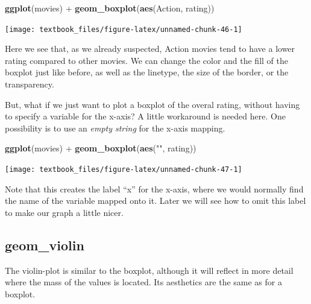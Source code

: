 \documentclass[]{tufte-book}
\newenvironment{Shaded}{}{}
\newcommand{\KeywordTok}[1]{\textcolor[rgb]{0.00,0.44,0.13}{\textbf{#1}}}
\newcommand{\NormalTok}[1]{#1}
\newcommand{\OperatorTok}[1]{\textcolor[rgb]{0.40,0.40,0.40}{#1}}
\newcommand{\StringTok}[1]{\textcolor[rgb]{0.25,0.44,0.63}{#1}}
\begin{document}
\begin{Shaded}
\begin{Highlighting}[]
\KeywordTok{ggplot}\NormalTok{(movies) }\OperatorTok{+}\StringTok{ }
\StringTok{    }\KeywordTok{geom_boxplot}\NormalTok{(}\KeywordTok{aes}\NormalTok{(Action, rating))}
\end{Highlighting}
\end{Shaded}

\texttt{[image: textbook\_files/figure-latex/unnamed-chunk-46-1]}

Here we see that, as we already suspected, Action movies tend to have a lower rating compared to other movies. We can change the color and the fill of the boxplot just like before, as well as the linetype, the size of the border, or the transparency.

But, what if we just want to plot a boxplot of the overal rating, without having to specify a variable for the x-axis? A little workaround is needed here. One possibility is to use an \emph{empty string} for the x-axis mapping.

\begin{Shaded}
\begin{Highlighting}[]
\KeywordTok{ggplot}\NormalTok{(movies) }\OperatorTok{+}
\StringTok{    }\KeywordTok{geom_boxplot}\NormalTok{(}\KeywordTok{aes}\NormalTok{(}\StringTok{""}\NormalTok{, rating))}
\end{Highlighting}
\end{Shaded}

\texttt{[image: textbook\_files/figure-latex/unnamed-chunk-47-1]}

Note that this creates the label ``x'' for the x-axis, where we would normally find the name of the variable mapped onto it. Later we will see how to omit this label to make our graph a little nicer.

\hypertarget{geom_violin}{%
\subsection{geom\_violin}\label{geom_violin}}

The violin-plot is similar to the boxplot, although it will reflect in more detail where the mass of the values is located. Its aesthetics are the same as for a boxplot.
\end{document}
